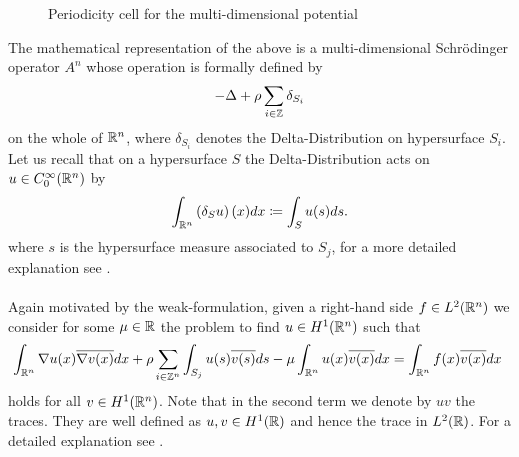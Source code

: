 \begin{figure}[!ht] \centering
	\caption{Periodicity cell for the multi-dimensional potential}
\end{figure}
The mathematical representation of the above is a multi-dimensional Schrödinger operator $A^{n}$ whose operation is formally defined by
\begin{equation}
	- \Delta + \rho \sum_{i \in \mathbb{Z}} \delta_{S_{i}} \label{eq:7.1-md_the_operator_A_formallyy}
\end{equation}
on the whole of $\mathbb{R}^{n}$, where $\delta_{S_{i}}$ denotes the Delta-Distribution on hypersurface $S_{i}$. Let us recall that on a hypersurface $S$ the Delta-Distribution acts on $u \in C_{0}^{\infty}(\mathbb{R}^{n})$ by 
	\[ \int_{\mathbb{R}^{n}} \left( \delta_{S} u \right) (x) dx \coloneqq \int_{S} u(s) ds . \]
where $s$ is the hypersurface measure associated to $S_{j}$, for a more detailed explanation see \cite{federer1978geomeasure}.
~\\ ~\\ %
Again motivated by the weak-formulation, given a right-hand side $f \in L^{2}(\mathbb{R}^{n})$ we consider for some $\mu \in \mathbb{R}$ the problem to find $u \in H^{1}(\mathbb{R}^{n})$ such that
	\begin{equation}
		\int_{\R^{n}} \nabla u(x) \overline{\nabla v(x)} dx + \rho \sum_{i \in \Z^{n}} \int_{S_{j}} u(s) \overline{v(s)} ds - \mu \int_{\R^{n}} u(x) \overline{v(x)} dx = \int_{\R^{n}} f(x) \overline{v(x)} dx \label{eq:7.2-md-weak-formulation}
	\end{equation} 
holds for all $v \in H^{1}(\mathbb{R}^{n})$. Note that in the second term we denote by $u v$ the traces. They are well defined as $u, v \in H^{1}(\mathbb{R})$ and hence the trace in $L^{2}(\mathbb{R})$. For a detailed explanation see \cite[page 164]{adams2003sobolev}.  

